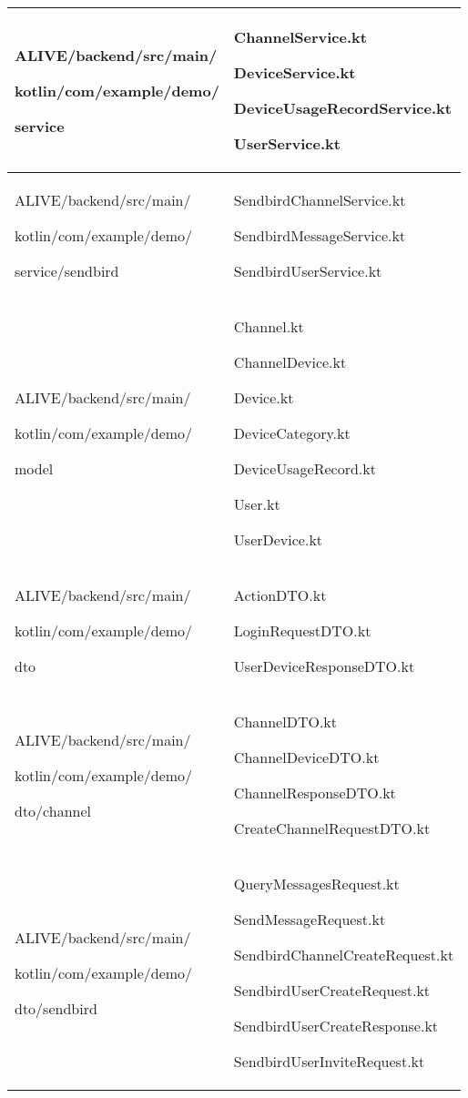 \documentclass[conference]{IEEEtran}
\begin{document}
\begin{enumerate}
\begin{itemize}
\begin{itemize}
\begin{enumerate}
\begin{table}[h!]
\begin{tabular}{|p{3.9cm}|p{4.4cm}|}
          ALIVE/backend/src/main/ \par kotlin/com/example/demo/ \par service & ChannelService.kt \par DeviceService.kt \par DeviceUsageRecordService.kt \par UserService.kt \\ \hline
          
          ALIVE/backend/src/main/ \par kotlin/com/example/demo/ \par service/sendbird & SendbirdChannelService.kt \par SendbirdMessageService.kt \par SendbirdUserService.kt \\ \hline
          
          ALIVE/backend/src/main/ \par kotlin/com/example/demo/ \par model & Channel.kt \par ChannelDevice.kt \par Device.kt \par DeviceCategory.kt \par DeviceUsageRecord.kt \par User.kt \par UserDevice.kt \\ \hline
          
          ALIVE/backend/src/main/ \par kotlin/com/example/demo/ \par dto & ActionDTO.kt \par LoginRequestDTO.kt \par UserDeviceResponseDTO.kt \\ \hline

          ALIVE/backend/src/main/ \par kotlin/com/example/demo/ \par dto/channel & ChannelDTO.kt \par ChannelDeviceDTO.kt \par ChannelResponseDTO.kt \par CreateChannelRequestDTO.kt \\ \hline
          
          
          ALIVE/backend/src/main/ \par kotlin/com/example/demo/ \par dto/sendbird &  QueryMessagesRequest.kt \par  SendMessageRequest.kt \par SendbirdChannelCreateRequest.kt \par SendbirdUserCreateRequest.kt \par SendbirdUserCreateResponse.kt
         \par SendbirdUserInviteRequest.kt \\ \hline
          

\end{tabular}
\end{table}
\end{enumerate}
\end{itemize}
\end{itemize}
\end{enumerate}
\end{document}
